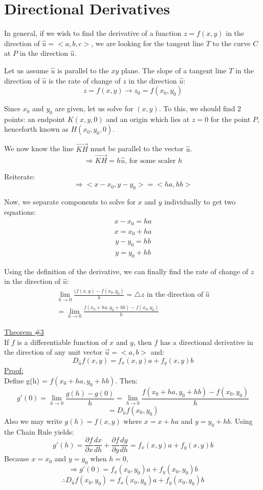\documentclass[12pt]{article}
\begin{document}
\section{Directional Derivatives}
In general, if we wish to find the derivative of a function \(z=f(x,y)\) in the direction of \(\hat{u} = <a,b,c>\), we are looking for the tangent line \(T\) to the curve \(C\) at \(P\) in the direction \(\hat{u}\).

Let us assume \(\hat{u}\) is parallel to the \(xy\) plane. The slope of a tangent line \(T\) in the direction of \(\hat{u}\) is the rate of change of \(z\) in the direction \(\hat{u}\):
\[
	z=f(x,y) \to z_0 = f(x_0, y_0)
\]

Since \(x_0\) and \(y_0\) are given, let us solve for \((x,y)\). To this, we should find 2 points: an endpoint \(K(x,y,0)\) and an origin which lies at \(z=0\) for the point \(P\), henceforth known as \(H(x_0,y_0,0)\). 

We now know the line \(\vec{KH} \) must be parallel to the vector \(\hat{u}\).
\[
	\Rightarrow \vec{KH} = h\hat{u} \text{, for some scaler \(h\)}
\]

Reiterate:
\[
	\Rightarrow <x-x_0,y-y_0> = <ha,hb>
\]

Now, we separate components to solve for \(x\) and \(y\) individually to get two equations:
\begin{align}
	\nonumber x-x_0 = ha\\
	x = x_0 + ha
\end{align}
\begin{align}
	\nonumber y - y_0 = hb\\
	y = y_0 + hb
\end{align}

Using the definition of the derivative, we can finally find the rate of change of \(z\) in the direction of \(\hat{u}\):
\begin{align}
	\lim_{h \to 0} \frac{(f(x,y) - f(x_0,y_0)}{h} = \triangle z \text{ in the direction of \(\hat{u}\)}\\
	= \lim_{h \to 0} \frac{f(x_0 + ha, y_0 + hb) - f(x_0,y_0)}{h}
\end{align}

\underline{Theorem \#3}\\
If \(f\) is a differentiable function of \(x\) and \(y\), then \(f\) has a directional derivative in the direction of any unit vector \(\vec{u}  = <a,b>\) and:
\[
	D_{\hat{u}}f(x,y) = f_x(x,y)a + f_y(x,y)b
\]
\underline{Proof:} \\
Define g(h) = \(f(x_0+ha,y_0+hb)\). Then:
\[
	g'(0) = \lim_{h \to 0} \frac{g(h) - g(0)}{h} = \lim_{h \to 0} \frac{f(x_0 + ha,y_0+hb) - f(x_0,y_0)}{h}
\]
\[
=	D_{\hat{u}}f(x_0,y_0) 
\]
Also we may write \(g(h) = f(x,y)\) where \(x=x+ha\) and \(y=y_0 +hb\). 
Using the Chain Rule yields:
\[
	g'(h) = \frac{\partial f}{\partial x} \frac{dx}{dh}+ \frac{\partial f}{\partial y} \frac{dy}{dh} = f_x(x,y)a + f_y(x,y)b
\]
Because \(x=x_0\) and \(y=y_0\) when \(h=0\),
\[
	\Rightarrow g'(0) = f_x(x_0,y_0)a + f_y(x_0,y_0)b
\]
\[
	\therefore D_{\hat{u} }f(x_0,y_0) = f_x(x_0,y_0)a + f_y(x_0,y_0)b
\]
\end{document}
